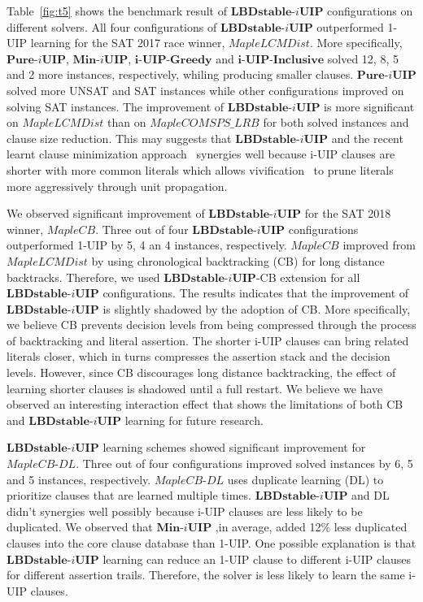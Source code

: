 \documentclass[runningheads]{llncs}
\newcommand{\IUIP}{\textbf{LBDstable-$i$UIP}}
\newcommand{\IUIPPURE}{\textbf{Pure-$i$UIP}}
\newcommand{\IUIPMIN}{\textbf{Min-$i$UIP}}
\newcommand{\IUIPGreedy}{\textbf{i-UIP-Greedy}}
\newcommand{\IUIPActive}{\textbf{i-UIP-Inclusive}}
\newcommand{\MapleBase}{\textit{MapleCOMSPS\_LRB}}
\newcommand{\MapleSeven}{\textit{MapleLCMDist}}
\newcommand{\MapleNineShort}{\textit{MapleCB-DL} }
\newcommand{\MapleEightShort}{\textit{MapleCB}}
\begin{document}
Table~\ref{fig:t5} shows the benchmark result of $\IUIP$
configurations on different solvers. All four configurations of
$\IUIP$ outperformed 1-UIP learning for the SAT 2017 race winner,
$\MapleSeven$. More specifically, $\IUIPPURE$, $\IUIPMIN$,
$\IUIPGreedy$ and $\IUIPActive$ solved 12, 8, 5 and 2 more instances,
respectively, whiling producing smaller clauses. $\IUIPPURE$ solved
more UNSAT and SAT instances while other configurations improved on
solving SAT instances.  The improvement of $\IUIP$ is more significant
on $\MapleSeven$ than on $\MapleBase$ for both solved instances and
clause size reduction. This may suggests that $\IUIP$ and the recent
learnt clause minimization approach~\cite{} synergies well because
i-UIP clauses are shorter with more common literals which allows
vivification~\cite{} to prune literals more aggressively through unit
propagation.

We observed significant improvement of $\IUIP$ for the SAT 2018
winner, $\MapleEightShort$. Three out of four $\IUIP$ configurations
outperformed 1-UIP by 5, 4 an 4 instances,
respectively. $\MapleEightShort$ improved from $\MapleSeven$ by using
chronological backtracking (CB) for long distance
backtracks. Therefore, we used $\IUIP$-CB extension for all $\IUIP$
configurations. The results indicates that the improvement of $\IUIP$
is slightly shadowed by the adoption of CB. More specifically, we
believe CB prevents decision levels from being compressed through the
process of backtracking and literal assertion. The shorter i-UIP
clauses can bring related literals closer, which in turns compresses
the assertion stack and the decision levels. However, since CB
discourages long distance backtracking, the effect of learning shorter
clauses is shadowed until a full restart.  We believe we have observed
an interesting interaction effect that shows the limitations of both
CB and $\IUIP$ learning for future research.

$\IUIP$ learning schemes showed significant improvement for
$\MapleNineShort$. Three out of four configurations improved solved
instances by 6, 5 and 5 instances, respectively. $\MapleNineShort$
uses duplicate learning (DL) to prioritize clauses that are learned
multiple times. $\IUIP$ and DL didn't synergies well possibly because
i-UIP clauses are less likely to be duplicated. We observed that
$\IUIPMIN$ ,in average, added 12\% less duplicated clauses into the
core clause database than 1-UIP. One possible explanation is that
$\IUIP$ learning can reduce an 1-UIP clause to different i-UIP clauses
for different assertion trails. Therefore, the solver is less likely
to learn the same i-UIP clauses.
\end{document}
